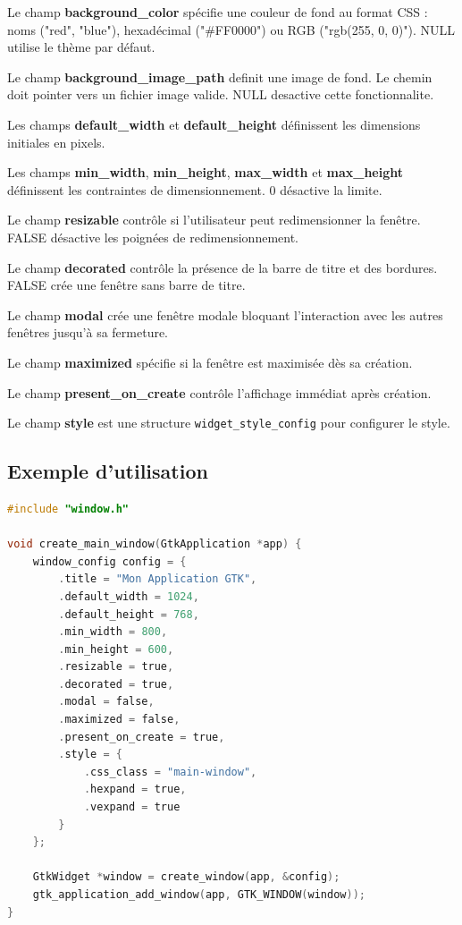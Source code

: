 Le champ \textbf{background\_color} spécifie une couleur de fond au format CSS : noms ("red", "blue"), hexadécimal ("\#FF0000") ou RGB ("rgb(255, 0, 0)"). NULL utilise le thème par défaut.

Le champ \textbf{background\_image\_path} definit une image de fond. Le chemin doit pointer vers un fichier image valide. NULL desactive cette fonctionnalite.

Les champs \textbf{default\_width} et \textbf{default\_height} définissent les dimensions initiales en pixels.

Les champs \textbf{min\_width}, \textbf{min\_height}, \textbf{max\_width} et \textbf{max\_height} définissent les contraintes de dimensionnement. 0 désactive la limite.

Le champ \textbf{resizable} contrôle si l'utilisateur peut redimensionner la fenêtre. FALSE désactive les poignées de redimensionnement.

Le champ \textbf{decorated} contrôle la présence de la barre de titre et des bordures. FALSE crée une fenêtre sans barre de titre.

Le champ \textbf{modal} crée une fenêtre modale bloquant l'interaction avec les autres fenêtres jusqu'à sa fermeture.

Le champ \textbf{maximized} spécifie si la fenêtre est maximisée dès sa création.

Le champ \textbf{present\_on\_create} contrôle l'affichage immédiat après création.

Le champ \textbf{style} est une structure \texttt{widget\_style\_config} pour configurer le style.

\subsection{Exemple d'utilisation}

\begin{lstlisting}[language=C]
#include "window.h"

void create_main_window(GtkApplication *app) {
    window_config config = {
        .title = "Mon Application GTK",
        .default_width = 1024,
        .default_height = 768,
        .min_width = 800,
        .min_height = 600,
        .resizable = true,
        .decorated = true,
        .modal = false,
        .maximized = false,
        .present_on_create = true,
        .style = {
            .css_class = "main-window",
            .hexpand = true,
            .vexpand = true
        }
    };

    GtkWidget *window = create_window(app, &config);
    gtk_application_add_window(app, GTK_WINDOW(window));
}
\end{lstlisting}
